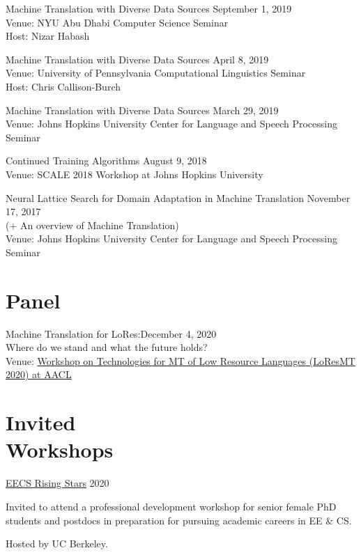 \documentclass[margin,line,hyperref,color]{res}
\newenvironment{packed_itemize}{
\begin{itemize}[leftmargin=1.5em]
  \setlength{\itemsep}{0pt}
  \setlength{\parskip}{0pt}
  \setlength{\parsep}{0pt}
}{\end{itemize}}
\begin{document}
\begin{resume}
Machine Translation with Diverse Data Sources \hfill September 1, 2019 \\
Venue: NYU Abu Dhabi Computer Science Seminar \\
Host: Nizar Habash

Machine Translation with Diverse Data Sources \hfill April 8, 2019 \\
Venue: University of Pennsylvania Computational Linguistics Seminar\\
Host: Chris Callison-Burch

Machine Translation with Diverse Data Sources \hfill March 29, 2019 \\
Venue: Johns Hopkins University Center for Language and Speech Processing Seminar

Continued Training Algorithms \hfill August 9, 2018\\
Venue:  SCALE 2018 Workshop at Johns Hopkins University 

Neural Lattice Search for Domain Adaptation in Machine Translation  \hfill November 17, 2017\\
(+ An overview of Machine Translation) \\
Venue: Johns Hopkins University Center for Language and Speech Processing Seminar

\section{\sc Panel}
Machine Translation for LoRes:\hfill December 4, 2020\\ Where do we stand and what the future holds? \\
Venue: \href{https://sites.google.com/view/loresmt/program?authuser=0}{Workshop on Technologies for MT of Low Resource Languages (LoResMT 2020) at AACL}

\section{\sc Invited \\Workshops}
\href{https://eecs.berkeley.edu/rising-stars-2020}{EECS Rising Stars}  \hfill 2020
 \begin{packed_itemize}
\item
Invited to attend a professional development workshop for senior female PhD students and postdocs in preparation for pursuing academic careers in EE \& CS.
\item Hosted by UC Berkeley.
 \end{packed_itemize}


\end{resume}
\end{document}
